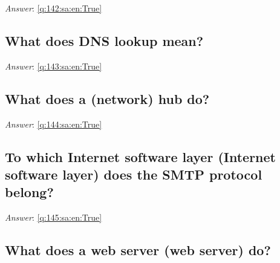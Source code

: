 \documentclass[a4paper,11pt,oneside]{article}
\begin{document}
\begin{sloppypar}
\noindent\makebox[\textwidth]{\hrulefill}

\vspace{1cm}

\textit{Answer}: \autoref{q:142:sa:en:True}



\subsection{What does DNS lookup mean?}

\label{q:143:sa:en:False}

\vspace{2cm}

\noindent\makebox[\textwidth]{\hrulefill}

\vspace{1cm}

\textit{Answer}: \autoref{q:143:sa:en:True}



\subsection{What does a (network) hub do?}

\label{q:144:sa:en:False}

\vspace{2cm}

\noindent\makebox[\textwidth]{\hrulefill}

\vspace{1cm}

\textit{Answer}: \autoref{q:144:sa:en:True}



\subsection{To which Internet software layer (Internet software layer) does the SMTP protocol belong?}

\label{q:145:sa:en:False}

\vspace{2cm}

\noindent\makebox[\textwidth]{\hrulefill}

\vspace{1cm}

\textit{Answer}: \autoref{q:145:sa:en:True}



\subsection{What does a web server (web server) do?}


\end{sloppypar}
\end{document}
